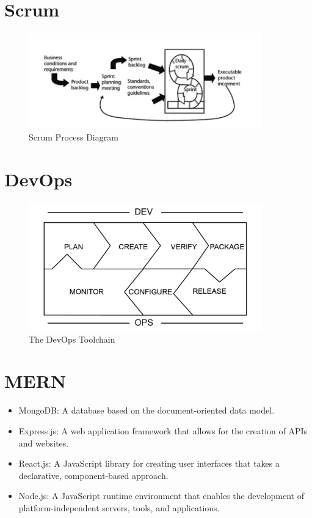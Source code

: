 \chapter{Scrum}\label{appendix:scrum}
\begin{figure}[h!]
    \centering
    \includegraphics[width=0.9\textwidth]{images/scrum.png}
    \caption{Scrum Process Diagram}
    \label{image:scrum}
\end{figure}

\chapter{DevOps}\label{appendix:devops}
\begin{figure}[h!]
    \centering
    \includegraphics[width=0.9\textwidth]{images/devops.png}
    \caption{The DevOps Toolchain}
    \label{image:devops}
\end{figure}

\chapter{MERN}\label{appendix:mern}
\begin{itemize}
\item MongoDB: A database based on the document-oriented data model.
\item Express.js: A web application framework that allows for the creation of APIs and websites.
\item React.js: A JavaScript library for creating user interfaces that takes a declarative, component-based approach.
\item Node.js: A JavaScript runtime environment that enables the development of platform-independent servers, tools, and applications.
\end{itemize}